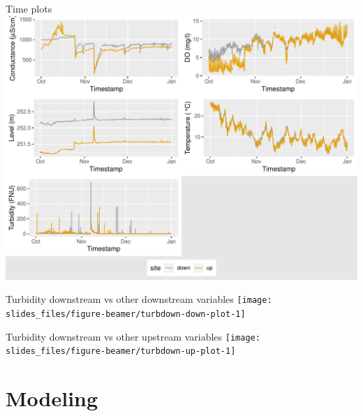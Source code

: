 \documentclass[14pt,ignorenonframetext,compress]{beamer}
\begin{document}
\begin{frame}{Time plots}
\protect\hypertarget{time-plots}{}
\includegraphics[width=1\linewidth]{slides_files/figure-beamer/tsplots-1}
\end{frame}

\begin{frame}
\begin{block}{Turbidity downstream vs other downstream variables}
\protect\hypertarget{turbidity-downstream-vs-other-downstream-variables}{}
\texttt{[image: slides\_files/figure-beamer/turbdown-down-plot-1]}
\end{block}
\end{frame}

\begin{frame}
\begin{block}{Turbidity downstream vs other upstream variables}
\protect\hypertarget{turbidity-downstream-vs-other-upstream-variables}{}
\texttt{[image: slides\_files/figure-beamer/turbdown-up-plot-1]}
\end{block}
\end{frame}

\hypertarget{modeling}{%
\section{Modeling}\label{modeling}}
\end{document}
